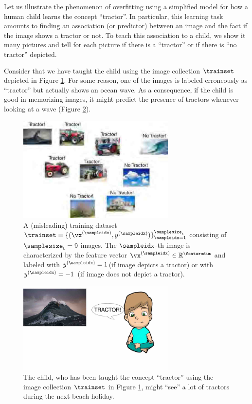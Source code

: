\documentclass[12pt]{report}
\begin{document}
Let us illustrate the phenomenon of overfitting using a simplified model 
for how a human child learns the concept ``tractor''. In particular, this 
learning task amounts to finding an association (or predictor) between 
an image and the fact if the image shows a tractor or not. To teach this 
association to a child, we show it many pictures and tell for each picture 
if there is a ``tractor'' or if there is ``no tractor'' depicted. 

Consider that we have taught the child using the image collection $\trainset$ 
depicted in Figure \ref{fig_misleading_data_set}. For some reason, one of 
the images is labeled erroneously as ``tractor'' but actually shows an ocean 
wave. As a consequence, if the child is good in memorizing images, it might 
predict the presence of tractors whenever looking at a wave (Figure \ref{equ_wave_as_tractor}). 

\begin{figure}[htbp]
	\centering
	\includegraphics[width=0.7\textwidth]{LabeledDataTractorOverfitting1.jpg}  
	\caption{A (misleading) training dataset $\trainset= \{ (\vx^{(\sampleidx)},y^{(\sampleidx)}) \}_{\sampleidx=1}^{\samplesize_{\rm t}}$ 
		consisting of $\samplesize_{\rm t}=9$ images. The $\sampleidx$-th image is characterized by the feature vector $\vx^{(\sampleidx)} \in \mathbb{R}^{\featuredim}$ 
		and labeled with $y^{(\sampleidx)}=1$(if image depicts a tractor) or with $y^{(\sampleidx)}=-1$ (if image does not depict a tractor).}
	\label{fig_misleading_data_set}
\end{figure}


\begin{figure}[htbp]
	\centering
	\includegraphics[width=0.7\textwidth]{OverfittingSample.jpg}   
	\caption{The child, who has been taught the concept ``tractor'' using the image collection 
		$\trainset$ in Figure \ref{fig_misleading_data_set}, might ``see'' a lot of tractors during the next beach holiday.}
	\label{equ_wave_as_tractor}   
\end{figure}
\end{document}
